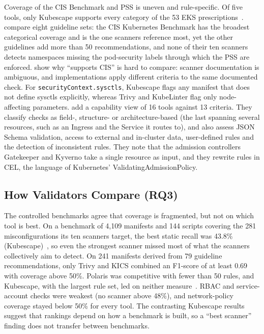 \documentclass[sigconf,nonacm]{acmart}
\begin{document}
Coverage of the CIS Benchmark and PSS is uneven and rule-specific. Of five tools, only Kubescape supports every category of the 53 EKS prescriptions~\cite{shamim2025}. \citet{krieger2026} compare eight guideline sets: the CIS Kubernetes Benchmark has the broadest categorical coverage and is the one scanners reference most, yet the other guidelines add more than 50 recommendations, and none of their ten scanners detects namespaces missing the pod-security labels through which the PSS are enforced. \citet{eom2026} show why ``supports CIS'' is hard to compare: scanner documentation is ambiguous, and implementations apply different criteria to the same documented check. For \texttt{securityContext.sysctls}, Kubescape flags any manifest that does not define sysctls explicitly, whereas Trivy and KubeLinter flag only node-affecting parameters. \citet{diarra2024} add a capability view of 16 tools against 13 criteria. They classify checks as field-, structure- or architecture-based (the last spanning several resources, such as an Ingress and the Service it routes to), and also assess JSON Schema validation, access to external and in-cluster data, user-defined rules and the detection of inconsistent rules. They note that the admission controllers Gatekeeper and Kyverno take a single resource as input, and they rewrite rules in CEL, the language of Kubernetes' ValidatingAdmissionPolicy.

\subsection{How Validators Compare (RQ3)}

The controlled benchmarks agree that coverage is fragmented, but not on which tool is best. On a benchmark of 4,109 manifests and 144 scripts covering the 281 misconfigurations its ten scanners target, the best static recall was 43.8\% (Kubescape)~\cite{eom2026}, so even the strongest scanner missed most of what the scanners collectively aim to detect. On 241 manifests derived from 79 guideline recommendations, only Trivy and KICS combined an F1-score of at least 0.69 with coverage above 50\%. Polaris was competitive with fewer than 50 rules, and Kubescape, with the largest rule set, led on neither measure~\cite{krieger2026}. RBAC and service-account checks were weakest (no scanner above 48\%), and network-policy coverage stayed below 50\% for every tool. The contrasting Kubescape results suggest that rankings depend on how a benchmark is built, so a ``best scanner'' finding does not transfer between benchmarks.
\end{document}
